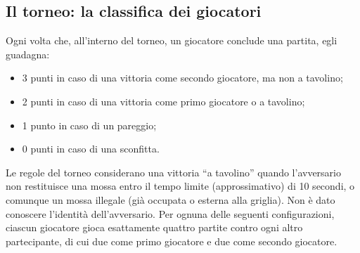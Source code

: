 \documentclass{article}
\begin{document}
\subsection{Il torneo: la classifica dei giocatori}

Ogni volta che, all'interno del torneo, un giocatore conclude una partita, egli
guadagna: 
\begin{itemize}
  \item 3 punti in caso di una vittoria come secondo giocatore, ma non a
    tavolino;
  \item 2 punti in caso di una vittoria come primo giocatore o a tavolino;
  \item 1 punto in caso di un pareggio;
  \item 0 punti in caso di una sconfitta.
\end{itemize}

\noindent
Le regole del torneo considerano una vittoria ``a tavolino'' quando l'avversario
non restituisce una mossa entro il tempo limite (approssimativo) di 10 secondi,
o comunque un mossa illegale (già occupata o esterna alla griglia). Non è dato
conoscere l'identità dell'avversario. Per ognuna delle seguenti configurazioni,
ciascun giocatore gioca esattamente quattro partite contro ogni altro
partecipante, di cui due come primo giocatore e due come secondo giocatore.
\end{document}
